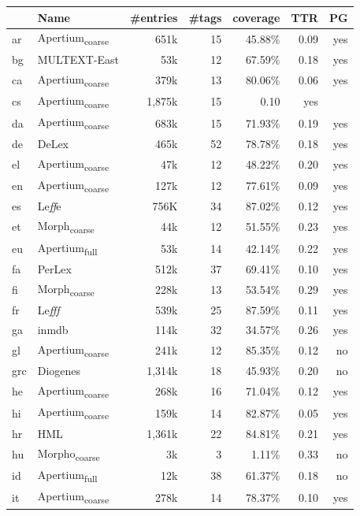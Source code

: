 \documentclass[11pt,letterpaper]{article}
\begin{document}
\begin{table}
\centering
\scriptsize
\begin{tabular}{llrrr|rr}
\toprule
 & Name & \#entries & \#tags  & coverage & TTR & PG \\
\midrule 
ar &   Apertium\textsubscript{coarse} & 651k & 15 & 45.88\% &0.09& yes \\
bg & MULTEXT-East & 53k &12 & 67.59\% & 0.18 & yes \\
ca &  Apertium\textsubscript{coarse} & 379k & 13 & 80.06\% & 0.06 & yes \\
cs &  Apertium\textsubscript{coarse} & 1,875k & 15  & 0.10 & yes \\
da & Apertium\textsubscript{coarse} & 683k & 15 & 71.93\% & 0.19 & yes \\
de & DeLex & 465k & 52 & 78.78\% & 0.18 &yes\\
el & Apertium\textsubscript{coarse} & 47k & 12 & 48.22\% & 0.20 & yes \\
en & Apertium\textsubscript{coarse} & 127k & 12 & 77.61\% & 0.09& yes \\
es & Le{\it ff}e &  756K & 34 & 87.02\% & 0.12 &yes\\
et & Morph\textsubscript{coarse} & 44k & 12 & 51.55\% & 0.23 & yes \\
eu & Apertium\textsubscript{full} & 53k &  14 & 42.14\% & 0.22 &  yes \\
fa  & PerLex &  512k & 37 & 69.41\% & 0.10 & yes\\
fi & Morph\textsubscript{coarse} & 228k & 13 & 53.54\% & 0.29 & yes \\
fr & Le{\it fff} & 539k & 25 & 87.59\% &0.11 &yes\\
ga & inmdb & 114k & 32 & 34.57\% & 0.26& yes\\
gl & Apertium\textsubscript{coarse} & 241k & 12 & 85.35\%  & 0.12 &no\\
grc  & Diogenes & 1,314k & 18 & 45.93\% & 0.20 &no\\
he & Apertium\textsubscript{coarse} & 268k & 16 & 71.04\% & 0.12 & yes\\
hi & Apertium\textsubscript{coarse} & 159k & 14 & 82.87\% & 0.05 & yes\\
hr  & HML   & 1,361k & 22 & 84.81\% & 0.21 & yes \\
hu & Morpho\textsubscript{coarse} & 3k & 3 & 1.11\% & 0.33 &no \\
id & Apertium\textsubscript{full }& 12k & 38 &61.37\% &0.18 & no   \\
it & Apertium\textsubscript{coarse} & 278k &14 & 78.37\% & 0.10 & yes\\

\end{tabular}
\end{table}
\end{document}
